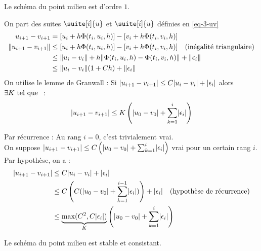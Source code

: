 		\begin{propShort}
			Le schéma du point milieu est d'ordre $1$.
		\end{propShort}	
		\begin{preuve}
			On part des suites $\suite[i]{u}$ et $\suite[i]{u}$ définies en \eqref{eq-3-uv}
			\begin{align*}
				u_{i+1} - v_{i+1} 			&= [u_i + h\Phi(t_i,u_i,h)] - [v_i + h\Phi(t_i,v_i,h)]		\\
				\lVert u_{i+1} - v_{i+1} \rVert 	&\leq [u_i + h\Phi(t_i,u_i,h)] - [v_i + h\Phi(t_i,v_i,h)]	\quad\text{(inégalité triangulaire)}	\\
											&\leq \lVert u_i - v_i \rVert + h\lVert \Phi(t_i,u_i,h) - \Phi(t_i,v_i,h) \rVert + \lVert \epsilon_i \rVert	\\
											&\leq \lVert u_i - v_i \rVert(1+Ch) + \lVert \epsilon_i \rVert
			\end{align*}
			On utilise le lemme de Granwall :
			Si $\lvert u_{i+1} - v_{i+1} \rvert \leq C\lvert u_i - v_i \rvert + \lvert \epsilon_i \rvert$ alors $\exists K \text{ tel que } $ :
			\begin{equation}
				\label{eq-2-granwall}
				\lvert u_{i+1} - v_{i+1} \rvert \leq K \left( \lvert u_0 - v_0 \rvert + \sum_{k=1}^i \lvert \epsilon_i \rvert \right)
			\end{equation}

			\begin{preuve}
				Par récurrence :
				Au rang $i=0$, c'est trivialement vrai.	\\
				On suppose $\lvert u_{i+1} - v_{i+1} \rvert \leq C \left( \lvert u_0 - v_0 \rvert + \sum_{k=1}^i \lvert \epsilon_i \rvert \right)$ vrai pour un certain rang $i$.
				Par hypothèse, on a :
				\begin{align*}
					\lvert u_{i+1} - v_{i+1} \rvert &\leq C\lvert u_i - v_i \rvert + \lvert \epsilon_i \rvert		\\
											&\leq C\left( C(\lvert u_0 - v_0 \rvert + \sum_{k=1}^{i-1} \lvert \epsilon_i \rvert) \right) + \lvert \epsilon_i \rvert	\quad\text{(hypothèse de récurrence)}	\\
											&\leq \underbrace{\max(C^2, C\lvert \epsilon_i \rvert)}_{K} \left( \lvert u_0 - v_0 \rvert + \sum_{k=1}^i \lvert \epsilon_i \rvert \right)	
				\end{align*}
			\end{preuve}
		\end{preuve}

		\begin{propShort}
			Le schéma du point milieu est stable et consistant.
		\end{propShort}



